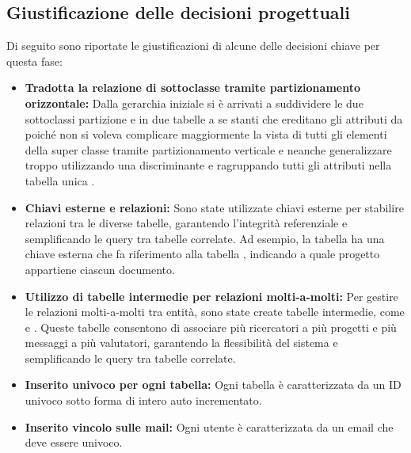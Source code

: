 \documentclass{report}
\begin{document}
\subsection{Giustificazione delle decisioni progettuali}
Di seguito sono riportate le giustificazioni di alcune delle decisioni chiave per questa fase:
\begin{itemize}

\item\textbf{ Tradotta la relazione di sottoclasse tramite partizionamento orizzontale:} Dalla gerarchia iniziale si è arrivati a suddividere le due sottoclassi partizione  e   in due tabelle a se stanti che ereditano gli attributi da  poiché non si voleva complicare maggiormente la vista di tutti gli elementi della super classe tramite partizionamento verticale e neanche generalizzare troppo utilizzando una discriminante e ragruppando tutti gli attributi nella tabella unica .

\item \textbf{Chiavi esterne e relazioni:} Sono state utilizzate chiavi esterne per stabilire relazioni tra le diverse tabelle, garantendo l'integrità referenziale e semplificando le query tra tabelle correlate. Ad esempio, la tabella  ha una chiave esterna che fa riferimento alla tabella , indicando a quale progetto appartiene ciascun documento.

\item \textbf{Utilizzo di tabelle intermedie per relazioni molti-a-molti:} Per gestire le relazioni molti-a-molti tra entità, sono state create tabelle intermedie, come  e . Queste tabelle consentono di associare più ricercatori a più progetti e più messaggi a più valutatori, garantendo la flessibilità del sistema e semplificando le query tra tabelle correlate.

\item \textbf{Inserito  univoco per ogni tabella:} Ogni tabella è caratterizzata da un ID univoco sotto forma di intero auto incrementato.

\item \textbf{Inserito vincolo  sulle mail:} Ogni utente è caratterizzata da un email che deve essere univoco.


\end{itemize}
\end{document}
